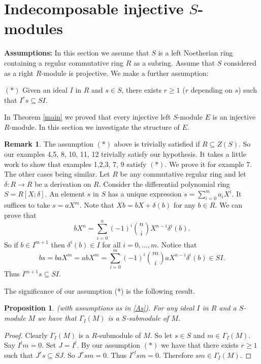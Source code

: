 \documentclass{amsart}
\theoremstyle{plain}
\newtheorem{proposition}[theorem]{Proposition}
\theoremstyle{definition}
\newtheorem{remark}[theorem]{Remark}
\theoremstyle{remark}
\numberwithin{equation}{theorem}
\begin{document}
\section{Indecomposable injective $S$-modules}
\s \label{As} {\textbf{Assumptions:}} In this section we assume that $S$ is a left Noetherian ring containing a regular commutative ring $R$ as a subring. Assume that $S$ considered as a right $R$-module is projective.   We make a further assumption:

$(*)$  Given an ideal $I$ in $R$ and $s \in S$, there exists $r \geq 1$ ($r$ depending on $s$) such that $I^rs \subseteq SI$.

In Theorem \ref{main} we proved that every injective left $S$-module $E$ is an injective $R$-module. In this section we investigate the structure of $E$.

\begin{remark}
The assumption $(*)$ above is trivially satisfied if $R \subseteq Z(S)$. So our examples 4,5, 8, 10, 11, 12 trivially satisfy
our hypothesis. It takes a little work to show that examples 1,2,3, 7, 9 satisfy $(*)$. We prove it for example 7. The other cases being similar.  Let $R$ be any commutative regular ring and let $\delta \colon R {\rightarrow} R$
be a derivation on $R$. Consider the differential polynomial ring $S = R[X; \delta]$.
An element $s$ in $S$ has a unique expression $s = \sum_{i = 0}^{m} a_i X^i$. It suffices to take  $s = aX^m$. Note that
$Xb = bX + \delta(b)$ for any $b \in R$. We can prove that
\[
bX^n = \sum_{i =0}^{n}(-1)^i \binom{n}{i} X^{n-i}\delta^i(b).
\]
So if $b \in I^{m+1}$ then $\delta^i(b) \in I$ for all $ i = 0,\ldots, m$. Notice that
\[
bs = baX^m  = ab X^m = \sum_{i =0}^{m}(-1)^i \binom{m}{i} aX^{n-i}\delta^i(b) \in SI.
\]
Thus $I^{m+1}s \subseteq SI$.
\end{remark}

The significance of our assumption (*) is the following result.

\begin{proposition}\label{Gamma}
(with assumptions as in \ref{As}). For any ideal $I$ in $R$ and a $S$-module $M$ we have that $\Gamma_I(M)$ is a
$S$-submodule of $M$.
\end{proposition}
\begin{proof}
Clearly $\Gamma_I(M)$ is a
$R$-submodule of $M$. So let $s \in S$ and $m \in \Gamma_I(M)$. Say $I^l m = 0$. Set $J = I^l$. By our assumption
$(*)$ we have that there exists $r \geq 1$ such that $J^rs \subseteq SJ$. So $J^rsm =0$. Thus $I^{rl}sm = 0$. Therefore $sm \in \Gamma_I(M)$.
\end{proof}
\end{document}

